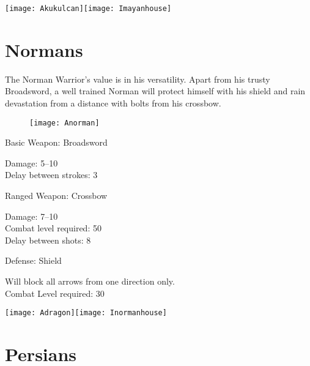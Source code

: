 \begin{center}
	\texttt{[image: Akukulcan]}\texttt{[image: Imayanhouse]}
\end{center}

\clearpage

\section{Normans}


The Norman Warrior’s value is in his versatility. Apart from his trusty Broadsword, a well trained Norman will protect himself with his shield and rain devastation from a distance with bolts from his crossbow.

\begin{wrapfigure}{r}{0.5\textwidth}
	\begin{center}
		\vspace{-20pt}
		\texttt{[image: Anorman]}
	\end{center}
	\vspace{-20pt}
\end{wrapfigure}

Basic Weapon: Broadsword
\begin{adjustwidth}{1cm}{}
	Damage: 5–10 \\
	Delay between strokes: 3
\end{adjustwidth}
Ranged Weapon: Crossbow
\begin{adjustwidth}{1cm}{}
	Damage: 7–10 \\
	Combat level required: 50 \\
	Delay between shots: 8
\end{adjustwidth}
Defense: Shield
\begin{adjustwidth}{1cm}{}
	Will block all arrows from one direction only. \\
	Combat Level required: 30 
\end{adjustwidth}

\begin{center}
	\texttt{[image: Adragon]}\texttt{[image: Inormanhouse]}
\end{center}

\clearpage

\section{Persians}

